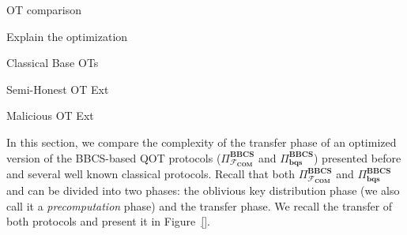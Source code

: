 OT comparison

Explain the optimization

Classical Base OTs

Semi-Honest OT Ext

Malicious OT Ext



In this section, we compare the complexity of the transfer phase of an optimized version of the BBCS-based QOT protocols ($\Pi^{\textbf{BBCS}}_{\mathcal{F}_{\textbf{COM}}}$ and $\Pi^{\textbf{BBCS}}_{\textbf{bqs}}$) presented before and several well known classical protocols. Recall that both $\Pi^{\textbf{BBCS}}_{\mathcal{F}_{\textbf{COM}}}$ and $\Pi^{\textbf{BBCS}}_{\textbf{bqs}}$ and can be divided into two phases: the oblivious key distribution phase (we also call it a \textit{precomputation} phase) and the transfer phase. We recall the transfer of both protocols and present it in Figure~\ref{}. 

